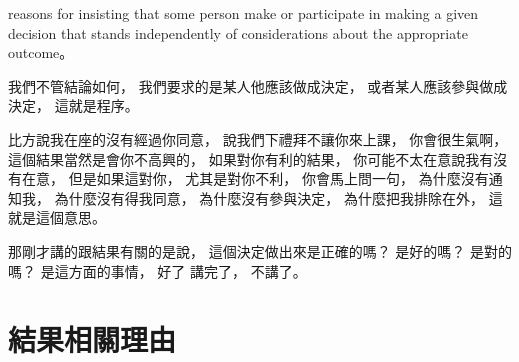 \hypertarget{w06:cue:2106}{}reasons for insisting that some person make
\hypertarget{w06:cue:2107}{}or participate in making a given decision
\hypertarget{w06:cue:2108}{}that stands independently of considerations
\hypertarget{w06:cue:2109}{}about the appropriate outcome。

\hypertarget{w06:cue:2110}{}我們不管結論如何，
\hypertarget{w06:cue:2111}{}我們要求的是某人他應該做成決定，
\hypertarget{w06:cue:2112}{}或者某人應該參與做成決定，
\hypertarget{w06:cue:2113}{}這就是程序。

\hypertarget{w06:cue:2114}{}比方說我在座的沒有經過你同意，
\hypertarget{w06:cue:2115}{}說我們下禮拜不讓你來上課，
\hypertarget{w06:cue:2116}{}你會很生氣啊，
\hypertarget{w06:cue:2117}{}這個結果當然是會你不高興的，
\hypertarget{w06:cue:2118}{}如果對你有利的結果，
\hypertarget{w06:cue:2119}{}你可能不太在意說我有沒有在意，
\hypertarget{w06:cue:2120}{}但是如果這對你，
\hypertarget{w06:cue:2121}{}尤其是對你不利，
\hypertarget{w06:cue:2122}{}你會馬上問一句，
\hypertarget{w06:cue:2123}{}為什麼沒有通知我，
\hypertarget{w06:cue:2124}{}為什麼沒有得我同意，
\hypertarget{w06:cue:2125}{}為什麼沒有參與決定，
\hypertarget{w06:cue:2126}{}為什麼把我排除在外，
\hypertarget{w06:cue:2127}{}這就是這個意思。

\hypertarget{w06:cue:2128}{}那剛才講的跟結果有關的是說，
\hypertarget{w06:cue:2129}{}這個決定做出來是正確的嗎？
\hypertarget{w06:cue:2130}{}是好的嗎？
\hypertarget{w06:cue:2131}{}是對的嗎？
\hypertarget{w06:cue:2132}{}是這方面的事情，
\hypertarget{w06:cue:2133}{}好了 講完了，
\hypertarget{w06:cue:2134}{}不講了。

\section{結果相關理由}

